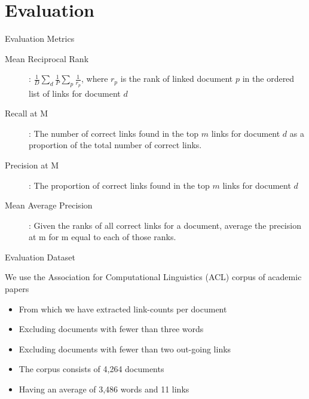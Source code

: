 \documentclass[xcolor=dvipsnames]{beamer}
\begin{document}
\section{Evaluation}
\begin{frame}{Evaluation Metrics}

\begin{description}
\item[Mean Reciprocal Rank]: $\frac{1}{D} \sum_d \frac{1}{P} \sum_p \frac{1}{r_p}$, where $r_p$ is the rank of linked document $p$ in the ordered list of links for document $d$ 
\item[Recall at M]: The number of correct links found in the top $m$ links for document $d$ as a proportion of the total number of correct links. 
\item[Precision at M]: The proportion of correct links found in the top $m$ links for document $d$
\item[Mean Average Precision]: Given the ranks of all correct links for a document, average the precision at m for m equal to each of those ranks. 
\end{description}

\end{frame}

\begin{frame}{Evaluation Dataset}

We use the Association for Computational Linguistics (ACL) corpus of academic papers

\begin{itemize}
    \item From which we have extracted link-counts per document
    \item Excluding documents with fewer than three words
    \item Excluding documents with fewer than two out-going links
    \item The corpus consists of 4,264 documents
    \item Having an average of 3,486 words and 11 links
\end{itemize}


\end{frame}
\end{document}
